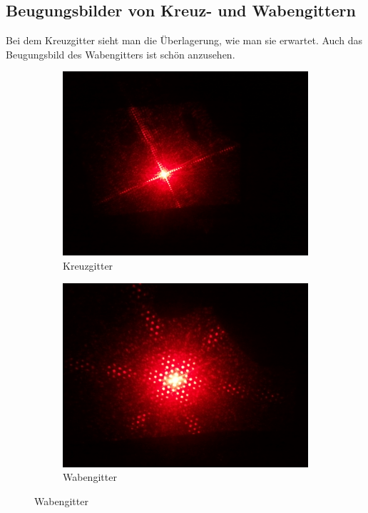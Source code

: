 \documentclass[ngerman, parskip*]{scrartcl}
\begin{document}
\subsection{Beugungsbilder von Kreuz- und Wabengittern}
Bei dem Kreuzgitter sieht man die Überlagerung, wie man sie erwartet.
Auch das Beugungsbild des Wabengitters ist schön anzusehen.
\begin{figure}[!h]
\centering
        \begin{subfigure}[!h]{0.49\textwidth}
          \centering
          \includegraphics[width=\textwidth,natwidth=2560,natheight=1920]{Bilder/Kreuzgitter.jpg}
          \caption{Kreuzgitter}
        \end{subfigure}
        \begin{subfigure}[!h]{0.49\textwidth}
          \centering
          \includegraphics[width=\textwidth,natwidth=2560,natheight=1920]{Bilder/Wabengitter.jpg}
          \caption{Wabengitter}
        \end{subfigure}
\end{figure}
\end{document}
